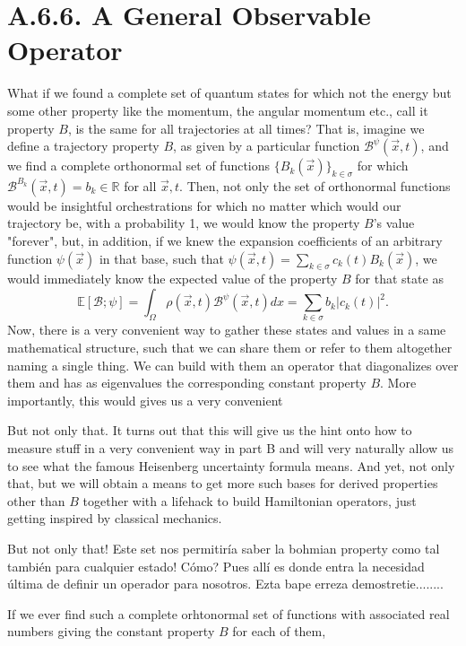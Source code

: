 \documentclass[11pt, a4paper]{article} %
\newcommand{\R}{\mathbb{R}} %
\newcommand{\B}{\mathcal{B}}
\newcommand{\E}{\mathbb{E}}
\begin{document}
\section*{A.6.6. A General Observable Operator}
What if we found a complete set of quantum states for which not the energy but some other property like the momentum, the angular momentum etc., call it property $B$, is the same for all trajectories at all times? That is, imagine we define a trajectory property $B$, as given by a particular function $\B^\psi (\vec{x},t)$, and we find a complete orthonormal set of functions $\{B_k(\vec{x})\}_{k\in\sigma}$ for which $\B^{B_k}(\vec{x},t)=b_k\in\R$ for all $\vec{x},t$. Then, not only the set of orthonormal functions would be insightful orchestrations for which no matter which would our trajectory be, with a probability 1, we would know the property $B$'s value "forever", but, in addition, if we knew the expansion coefficients of an arbitrary function $\psi(\vec{x})$ in that base, such that $\psi(\vec{x},t)=\sum_{k\in\sigma}c_k(t)B_k(\vec{x})$, we would immediately know the expected value of the property $B$ for that state as
\begin{equation}
\E[\B; \psi]=\int_\Omega \rho(\vec{x},t)\B^\psi(\vec{x},t)dx=\sum_{k\in\sigma} b_k|c_k(t)|^2.
\end{equation}
Now, there is a very convenient way to gather these states and values in a same mathematical structure, such that we can share them or refer to them altogether naming a single thing. We can build with them an operator that diagonalizes over them and has as eigenvalues the corresponding constant property $B$. 
More importantly, this would gives us a very convenient 

But not only that. It turns out that this will give us the hint onto how to measure stuff in a very convenient way in part B and will very naturally allow us to see what the famous Heisenberg uncertainty formula means. And yet, not only that, but we will obtain a means to get more such bases for derived properties other than $B$ together with a lifehack to build Hamiltonian operators, just getting inspired by classical mechanics.

But not only that! Este set nos permitiría saber la bohmian property como tal también para cualquier estado! Cómo? Pues allí es donde entra la necesidad última de definir un operador para nosotros. Ezta bape erreza demostretie........

If we ever find such a complete orhtonormal set of functions with associated real numbers giving the constant property $B$ for each of them, 
\end{document}
